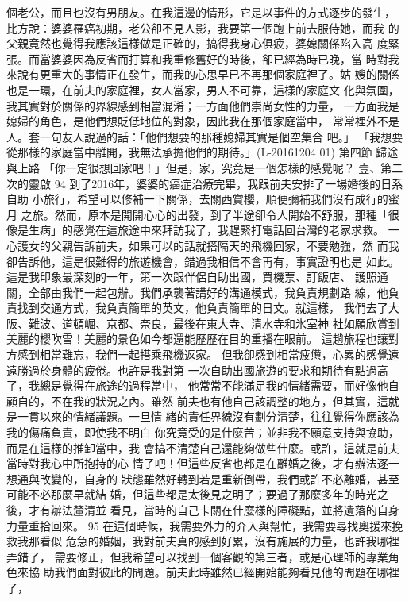 個老公，而且也沒有男朋友。在我這邊的情形，它是以事件的方式逐步的發生，
比方說：婆婆罹癌初期，老公卻不見人影，我要第一個跑上前去服侍她，而我
的父親竟然也覺得我應該這樣做是正確的，搞得我身心俱疲，婆媳關係陷入高
度緊張。而當婆婆因為反省而打算和我重修舊好的時後，卻已經為時已晚，當
時對我來說有更重大的事情正在發生，而我的心思早已不再那個家庭裡了。姑
嫂的關係也是一環，在前夫的家庭裡，女人當家，男人不可靠，這樣的家庭文
化與氛圍，我其實對於關係的界線感到相當混淆；一方面他們崇尚女性的力量，
一方面我是媳婦的角色，是他們想貶低地位的對象，因此我在那個家庭當中，
常常裡外不是人。套一句友人說過的話：「他們想要的那種媳婦其實是個空集合
吧。」 
「我想要從那樣的家庭當中離開，我無法承擔他們的期待。」(L-20161204
01) 
第四節 歸途與上路 
「你一定很想回家吧！」但是，家，究竟是一個怎樣的感覺呢？ 
壹、第二次的靈啟 
94 
到了2016年，婆婆的癌症治療完畢，我跟前夫安排了一場婚後的日系自助
小旅行，希望可以修補一下關係，去關西賞櫻，順便彌補我們沒有成行的蜜月
之旅。然而，原本是開開心心的出發，到了半途卻令人開始不舒服，那種「很
像是生病」的感覺在這旅途中來拜訪我了，我趕緊打電話回台灣的老家求救。
一心護女的父親告訴前夫，如果可以的話就搭隔天的飛機回家，不要勉強，然
而我卻告訴他，這是很難得的旅遊機會，錯過我相信不會再有，事實證明也是
如此。這是我印象最深刻的一年，第一次跟伴侶自助出國，買機票、訂飯店、
護照通關，全部由我們一起包辦。我們承襲著講好的溝通模式，我負責規劃路
線，他負責找到交通方式，我負責簡單的英文，他負責簡單的日文。就這樣，
我們去了大阪、難波、道頓崛、京都、奈良，最後在東大寺、清水寺和氷室神
社如願欣賞到美麗的櫻吹雪！美麗的景色如今都還能歷歷在目的重播在眼前。
這趟旅程也讓對方感到相當難忘，我們一起搭乘飛機返家。 
但我卻感到相當疲憊，心累的感覺遠遠勝過於身體的疲倦。也許是我對第
一次自助出國旅遊的要求和期待有點過高了，我總是覺得在旅途的過程當中，
他常常不能滿足我的情緒需要，而好像他自顧自的，不在我的狀況之內。雖然
前夫也有他自己該調整的地方，但其實，這就是一貫以來的情緒議題。一旦情
緒的責任界線沒有劃分清楚，往往覺得你應該為我的傷痛負責，即使我不明白
你究竟受的是什麼苦；並非我不願意支持與協助，而是在這樣的推卸當中，我
會搞不清楚自己還能夠做些什麼。或許，這就是前夫當時對我心中所抱持的心
情了吧！但這些反省也都是在離婚之後，才有辦法逐一想通與改變的，自身的
狀態雖然好轉到若是重新倒帶，我們或許不必離婚，甚至可能不必那麼早就結
婚，但這些都是太後見之明了；要過了那麼多年的時光之後，才有辦法釐清並
看見，當時的自己卡關在什麼樣的障礙點，並將遺落的自身力量重拾回來。 
95 
在這個時候，我需要外力的介入與幫忙，我需要尋找奧援來挽救我那看似
危急的婚姻，我對前夫真的感到好累，沒有施展的力量，也許我哪裡弄錯了，
需要修正，但我希望可以找到一個客觀的第三者，或是心理師的專業角色來協
助我們面對彼此的問題。前夫此時雖然已經開始能夠看見他的問題在哪裡了，

